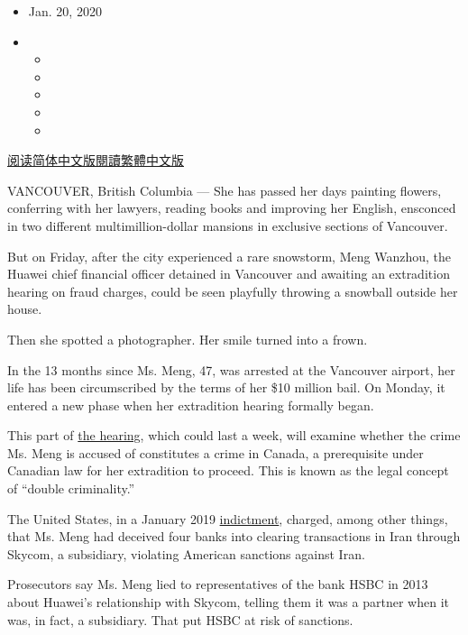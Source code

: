 \begin{itemize}
\item
  Jan. 20, 2020
\item
  \begin{itemize}
  \item
  \item
  \item
  \item
  \item
  \end{itemize}
\end{itemize}

\href{https://cn.nytimes.com/world/20200121/meng-wanzhou-huawei-detention-vancouver/}{阅读简体中文版}\href{https://cn.nytimes.com/world/20200121/meng-wanzhou-huawei-detention-vancouver/zh-hant/}{閱讀繁體中文版}

VANCOUVER, British Columbia --- She has passed her days painting
flowers, conferring with her lawyers, reading books and improving her
English, ensconced in two different multimillion-dollar mansions in
exclusive sections of Vancouver.

But on Friday, after the city experienced a rare snowstorm, Meng
Wanzhou, the Huawei chief financial officer detained in Vancouver and
awaiting an extradition hearing on fraud charges, could be seen
playfully throwing a snowball outside her house.

Then she spotted a photographer. Her smile turned into a frown.

In the 13 months since Ms. Meng, 47, was arrested at the Vancouver
airport, her life has been circumscribed by the terms of her \$10
million bail. On Monday, it entered a new phase when her extradition
hearing formally began.

This part of
\href{https://www.nytimes.com/2020/01/19/world/canada/19meng-wanzhou-extradition-huawei.html}{the
hearing}, which could last a week, will examine whether the crime Ms.
Meng is accused of constitutes a crime in Canada, a prerequisite under
Canadian law for her extradition to proceed. This is known as the legal
concept of ``double criminality.''

The United States, in a January 2019
\href{https://www.nytimes.com/2019/01/28/us/politics/meng-wanzhou-huawei-iran.html}{indictment},
charged, among other things, that Ms. Meng had deceived four banks into
clearing transactions in Iran through Skycom, a subsidiary, violating
American sanctions against Iran.

Prosecutors say Ms. Meng lied to representatives of the bank HSBC in
2013 about Huawei's relationship with Skycom, telling them it was a
partner when it was, in fact, a subsidiary. That put HSBC at risk of
sanctions.

